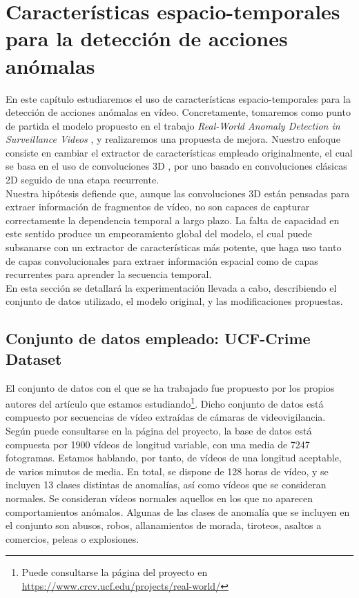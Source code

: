 \documentclass[../main.tex]{memoir}
\begin{document}
\chapter{Características espacio-temporales para la detección de
  acciones anómalas}
\label{sec:model-analysis}

En este capítulo estudiaremos el uso de características
espacio-temporales para la detección de acciones anómalas en vídeo.
Concretamente, tomaremos como punto de partida el modelo propuesto en
el trabajo \textit{Real-World Anomaly Detection in Surveillance
  Videos} \cite{sultani2018real}, y realizaremos una propuesta de
mejora. Nuestro enfoque consiste en cambiar el extractor de
características empleado originalmente, el cual se basa en el uso de
convoluciones 3D \cite{tran2015learning}, por uno basado en
convoluciones clásicas 2D seguido de una etapa recurrente.\\

Nuestra hipótesis defiende que, aunque las convoluciones 3D están
pensadas para extraer información de fragmentos de vídeo, no son
capaces de capturar correctamente la dependencia temporal a largo
plazo. La falta de capacidad en este sentido produce un empeoramiento
global del modelo, el cual puede subsanarse con un extractor de
características más potente, que haga uso tanto de capas
convolucionales para extraer información espacial como de capas
recurrentes para aprender la secuencia temporal.\\

En esta sección se detallará la experimentación llevada a cabo,
describiendo el conjunto de datos utilizado, el modelo original,
y las modificaciones propuestas.

\section{Conjunto de datos empleado: UCF-Crime Dataset}

El conjunto de datos con el que se ha trabajado fue propuesto por los
propios autores del artículo que estamos estudiando\footnote{Puede
  consultarse la página del proyecto en
  \url{https://www.crcv.ucf.edu/projects/real-world/}}. Dicho conjunto
de datos está compuesto por secuencias de vídeo extraídas de cámaras
de videovigilancia. Según puede consultarse en la página del proyecto,
la base de datos está compuesta por 1900 vídeos de longitud variable,
con una media de 7247 fotogramas. Estamos hablando, por tanto, de
vídeos de una longitud aceptable, de varios minutos de media. En
total, se dispone de 128 horas de vídeo, y se incluyen 13 clases
distintas de anomalías, así como vídeos que se consideran normales. Se
consideran vídeos normales aquellos en los que no aparecen
comportamientos anómalos. Algunas de las clases de anomalía que se
incluyen en el conjunto son abusos, robos, allanamientos de morada,
tiroteos, asaltos a comercios, peleas o explosiones.\\
\end{document}
